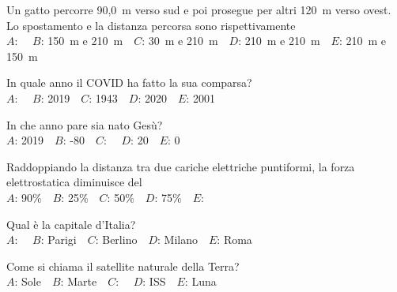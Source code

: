 \mcquestionfooter



\def\mcquestionnumber{5}


\mcquestionheader Un gatto percorre 90,0~m verso sud e poi prosegue per altri 120~m verso ovest. Lo spostamento e la distanza percorsa sono rispettivamente\\
{$A$}: \ \ {$B$}: 150~m e 210~m\ \ {$C$}: 30~m e 210~m\ \ {$D$}: 210~m e 210~m\ \ {$E$}: 210~m e 150~m\ \ 

\mcquestionfooter



\def\mcquestionnumber{6}


\mcquestionheader In quale anno il COVID ha fatto la sua comparsa?\\
{$A$}: \ \ {$B$}: 2019\ \ {$C$}: 1943\ \ {$D$}: 2020\ \ {$E$}: 2001\ \ 

\mcquestionfooter



\def\mcquestionnumber{7}


\mcquestionheader In che anno pare sia nato Gesù?\\
{$A$}: 2019\ \ {$B$}: -80\ \ {$C$}: \ \ {$D$}: 20\ \ {$E$}: 0\ \ 

\mcquestionfooter



\def\mcquestionnumber{8}


\mcquestionheader Raddoppiando la distanza tra due cariche elettriche puntiformi, la forza elettrostatica diminuisce del\\
{$A$}: 90\%\ \ {$B$}: 25\%\ \ {$C$}: 50\%\ \ {$D$}: 75\%\ \ {$E$}: \ \ 

\mcquestionfooter



\def\mcquestionnumber{9}


\mcquestionheader Qual è la capitale d’Italia?\\
{$A$}: \ \ {$B$}: Parigi\ \ {$C$}: Berlino\ \ {$D$}: Milano\ \ {$E$}: Roma\ \ 

\mcquestionfooter



\def\mcquestionnumber{10}


\mcquestionheader Come si chiama il satellite naturale della Terra?\\
{$A$}: Sole\ \ {$B$}: Marte\ \ {$C$}: \ \ {$D$}: ISS\ \ {$E$}: Luna\ \ 

\mcquestionfooter



\def\mcquestionnumber{11}


